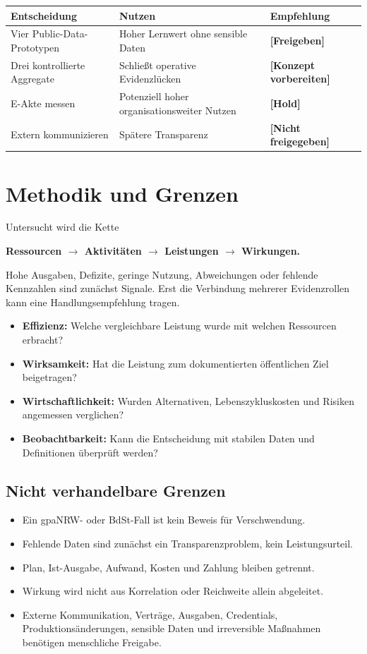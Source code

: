 \documentclass[11pt,a4paper]{article}
\newcommand{\status}[1]{\textbf{[#1]}}
\begin{document}
\begin{longtable}{p{4.1cm}p{5.3cm}p{4.5cm}}
\toprule
\textbf{Entscheidung} & \textbf{Nutzen} & \textbf{Empfehlung} \\
\midrule
Vier Public-Data-Prototypen & Hoher Lernwert ohne sensible Daten & \status{Freigeben} \\
Drei kontrollierte Aggregate & Schließt operative Evidenzlücken & \status{Konzept vorbereiten} \\
E-Akte messen & Potenziell hoher organisationsweiter Nutzen & \status{Hold} \\
Extern kommunizieren & Spätere Transparenz & \status{Nicht freigegeben} \\
\bottomrule
\end{longtable}

\section{Methodik und Grenzen}

Untersucht wird die Kette

\begin{center}
\textbf{Ressourcen $\rightarrow$ Aktivitäten $\rightarrow$ Leistungen $\rightarrow$ Wirkungen.}
\end{center}

Hohe Ausgaben, Defizite, geringe Nutzung, Abweichungen oder fehlende Kennzahlen sind zunächst Signale. Erst die Verbindung mehrerer Evidenzrollen kann eine Handlungsempfehlung tragen.

\begin{itemize}
  \item \textbf{Effizienz:} Welche vergleichbare Leistung wurde mit welchen Ressourcen erbracht?
  \item \textbf{Wirksamkeit:} Hat die Leistung zum dokumentierten öffentlichen Ziel beigetragen?
  \item \textbf{Wirtschaftlichkeit:} Wurden Alternativen, Lebenszykluskosten und Risiken angemessen verglichen?
  \item \textbf{Beobachtbarkeit:} Kann die Entscheidung mit stabilen Daten und Definitionen überprüft werden?
\end{itemize}

\subsection{Nicht verhandelbare Grenzen}

\begin{itemize}
  \item Ein gpaNRW- oder BdSt-Fall ist kein Beweis für Verschwendung.
  \item Fehlende Daten sind zunächst ein Transparenzproblem, kein Leistungsurteil.
  \item Plan, Ist-Ausgabe, Aufwand, Kosten und Zahlung bleiben getrennt.
  \item Wirkung wird nicht aus Korrelation oder Reichweite allein abgeleitet.
  \item Externe Kommunikation, Verträge, Ausgaben, Credentials, Produktionsänderungen, sensible Daten und irreversible Maßnahmen benötigen menschliche Freigabe.
\end{itemize}
\end{document}
